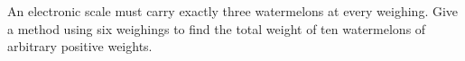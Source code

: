 An electronic scale must carry exactly three watermelons at every weighing. Give a method using six weighings to find the total weight of ten watermelons of arbitrary positive weights.
